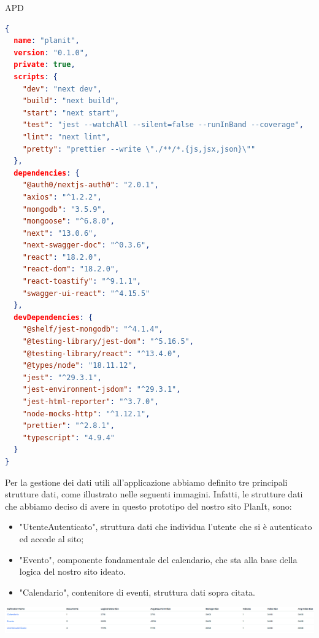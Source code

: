 \begin{listaPersonale} {APD}
    \begin{lstlisting}[language=json,firstnumber=1]
{
  name: "planit",
  version: "0.1.0",
  private: true,
  scripts: {
    "dev": "next dev",
    "build": "next build",
    "start": "next start",
    "test": "jest --watchAll --silent=false --runInBand --coverage",
    "lint": "next lint",
    "pretty": "prettier --write \"./**/*.{js,jsx,json}\""
  },
  dependencies: {
    "@auth0/nextjs-auth0": "2.0.1",
    "axios": "^1.2.2",
    "mongodb": "3.5.9",
    "mongoose": "^6.8.0",
    "next": "13.0.6",
    "next-swagger-doc": "^0.3.6",
    "react": "18.2.0",
    "react-dom": "18.2.0",
    "react-toastify": "^9.1.1",
    "swagger-ui-react": "^4.15.5"
  },
  devDependencies: {
    "@shelf/jest-mongodb": "^4.1.4",
    "@testing-library/jest-dom": "^5.16.5",
    "@testing-library/react": "^13.4.0",
    "@types/node": "18.11.12",
    "jest": "^29.3.1",
    "jest-environment-jsdom": "^29.3.1",
    "jest-html-reporter": "^3.7.0",
    "node-mocks-http": "^1.12.1",
    "prettier": "^2.8.1",
    "typescript": "4.9.4"
  }
}
    \end{lstlisting}
    \newpage
    Per la gestione dei dati utili all'applicazione abbiamo definito tre principali strutture dati, come illustrato nelle seguenti immagini. Infatti, le strutture dati che abbiamo deciso di avere in questo prototipo del nostro sito PlanIt, sono:
    \begin{itemize}
        \item "UtenteAutenticato", struttura dati che individua l'utente che si è autenticato ed accede al sito;
        \item "Evento", componente fondamentale del calendario, che sta alla base della logica del nostro sito ideato.
        \item "Calendario", contenitore di eventi, struttura dati sopra citata.
    \end{itemize}
    \begin{center}
        \includegraphics[width=1.1\textwidth, height=0.07\textheight]{img/png/DB/collections.png}
    \end{center}

\end{listaPersonale}
